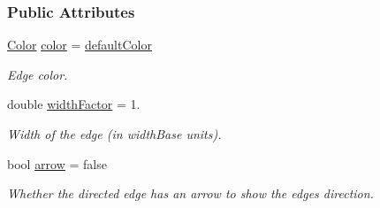 \subsubsection*{Public Attributes}
\begin{DoxyCompactItemize}
\item 
\hyperlink{colors_8h_ab87bacfdad76e61b9412d7124be44c1c}{Color} \hyperlink{structEdgeStyle_ac413825d81fcff04152f5dbadc18bb7f}{color} = \hyperlink{structEdgeStyle_ac7b5e5bda23384d1d341a61aa8d36357}{default\+Color}\hypertarget{structEdgeStyle_ac413825d81fcff04152f5dbadc18bb7f}{}\label{structEdgeStyle_ac413825d81fcff04152f5dbadc18bb7f}

\begin{DoxyCompactList}\small\item\em Edge color. \end{DoxyCompactList}\item 
double \hyperlink{structEdgeStyle_a01b59f72548e9fb4c853044c3253682d}{width\+Factor} = 1.\hypertarget{structEdgeStyle_a01b59f72548e9fb4c853044c3253682d}{}\label{structEdgeStyle_a01b59f72548e9fb4c853044c3253682d}

\begin{DoxyCompactList}\small\item\em Width of the edge (in width\+Base units). \end{DoxyCompactList}\item 
bool \hyperlink{structEdgeStyle_a57db6262a5d52a9f7924b27be9fb44d7}{arrow} = false\hypertarget{structEdgeStyle_a57db6262a5d52a9f7924b27be9fb44d7}{}\label{structEdgeStyle_a57db6262a5d52a9f7924b27be9fb44d7}

\begin{DoxyCompactList}\small\item\em Whether the directed edge has an arrow to show the edge\textquotesingle{}s direction. \end{DoxyCompactList}\end{DoxyCompactItemize}
